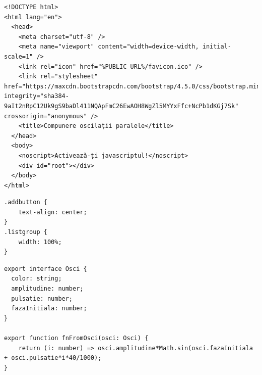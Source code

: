 \documentclass[numbers=endperiod]{scrreprt}
\begin{document}
\begin{verbatim}
<!DOCTYPE html>
<html lang="en">
  <head>
    <meta charset="utf-8" />
    <meta name="viewport" content="width=device-width, initial-scale=1" />
    <link rel="icon" href="%PUBLIC_URL%/favicon.ico" />
    <link rel="stylesheet" href="https://maxcdn.bootstrapcdn.com/bootstrap/4.5.0/css/bootstrap.min.css" integrity="sha384-9aIt2nRpC12Uk9gS9baDl411NQApFmC26EwAOH8WgZl5MYYxFfc+NcPb1dKGj7Sk" crossorigin="anonymous" />
    <title>Compunere oscilații paralele</title>
  </head>
  <body>
    <noscript>Activează-ți javascriptul!</noscript>
    <div id="root"></div>
  </body>
</html>

\end{verbatim}
\begin{verbatim}
.addbutton {
    text-align: center;
}
.listgroup {
    width: 100%;
}
\end{verbatim}
\begin{verbatim}
export interface Osci {
  color: string;
  amplitudine: number;
  pulsatie: number;
  fazaInitiala: number;
}

export function fnFromOsci(osci: Osci) {
    return (i: number) => osci.amplitudine*Math.sin(osci.fazaInitiala + osci.pulsatie*i*40/1000);
}
\end{verbatim}
\end{document}
